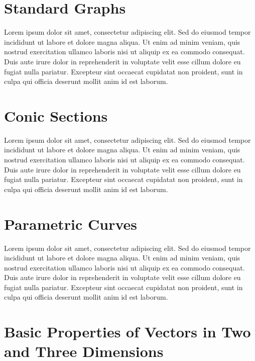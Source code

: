 \documentclass[a4paper]{article}
\begin{document}
\newpage

\setcounter{section}{0}
\renewcommand{\thesection}{1A}
\section{Standard Graphs}

Lorem ipsum dolor sit amet, consectetur adipiscing elit. Sed do eiusmod tempor
incididunt ut labore et dolore magna aliqua. Ut enim ad minim veniam, quis
nostrud exercitation ullamco laboris nisi ut aliquip ex ea commodo consequat.
Duis aute irure dolor in reprehenderit in voluptate velit esse cillum dolore eu
fugiat nulla pariatur. Excepteur sint occaecat cupidatat non proident, sunt in
culpa qui officia deserunt mollit anim id est laborum.

\renewcommand{\thesection}{1B}
\section{Conic Sections}

Lorem ipsum dolor sit amet, consectetur adipiscing elit. Sed do eiusmod tempor
incididunt ut labore et dolore magna aliqua. Ut enim ad minim veniam, quis
nostrud exercitation ullamco laboris nisi ut aliquip ex ea commodo consequat.
Duis aute irure dolor in reprehenderit in voluptate velit esse cillum dolore eu
fugiat nulla pariatur. Excepteur sint occaecat cupidatat non proident, sunt in
culpa qui officia deserunt mollit anim id est laborum.

\renewcommand{\thesection}{1C}
\section{Parametric Curves}

Lorem ipsum dolor sit amet, consectetur adipiscing elit. Sed do eiusmod tempor
incididunt ut labore et dolore magna aliqua. Ut enim ad minim veniam, quis
nostrud exercitation ullamco laboris nisi ut aliquip ex ea commodo consequat.
Duis aute irure dolor in reprehenderit in voluptate velit esse cillum dolore eu
fugiat nulla pariatur. Excepteur sint occaecat cupidatat non proident, sunt in
culpa qui officia deserunt mollit anim id est laborum.

\renewcommand{\thesection}{\arabic{section}}
\setcounter{section}{1}


\setcounter{section}{1}
\renewcommand{\thesection}{2A}
\section{Basic Properties of Vectors in Two and Three Dimensions}
\end{document}
